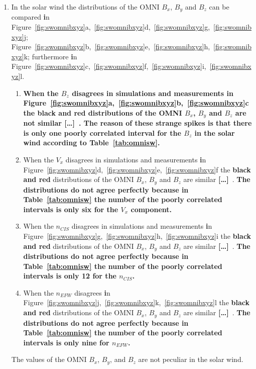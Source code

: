 \documentclass[linenumbers,draft]{agujournal}
\newcommand{\del}{\textbf{[\dots]}\ } %
\begin{document}
\begin{enumerate}
\item In the solar wind the distributions of the OMNI $B_{x}$, $B_{y}$ and $B_{z}$ can be compared \textbf{i}n Figure~\ref{fig:swomnibxyz}a,~\ref{fig:swomnibxyz}d,~\ref{fig:swomnibxyz}g,~\ref{fig:swomnibxyz}j; Figure~\ref{fig:swomnibxyz}b,~\ref{fig:swomnibxyz}e,~\ref{fig:swomnibxyz}h,~\ref{fig:swomnibxyz}k; furthermore \textbf{i}n Figure~\ref{fig:swomnibxyz}c,~\ref{fig:swomnibxyz}f,~\ref{fig:swomnibxyz}i,~\ref{fig:swomnibxyz}l.
\begin{enumerate}
\item \textbf{When the $B_{z}$ disagrees in simulations and measurements \textbf{i}n Figure~\ref{fig:swomnibxyz}a,~\ref{fig:swomnibxyz}b,~\ref{fig:swomnibxyz}c the black and red distributions of the OMNI $B_{x}$, $B_{y}$ and $B_{z}$ are not similar \del. The reason of these strange spikes is that there is only one poorly correlated interval for the $B_{z}$ in the solar wind according to Table~\ref{tab:omnisw}.}

\item When the $V_{x}$ disagrees in simulations and measurements \textbf{i}n Figure~\ref{fig:swomnibxyz}d,~\ref{fig:swomnibxyz}e,~\ref{fig:swomnibxyz}f the \textbf{black and red} distributions of the OMNI $B_{x}$, $B_{y}$ and $B_{z}$ are similar \del. \textbf{The distributions do not agree perfectly because in Table~\ref{tab:omnisw} the number of the poorly correlated intervals is only six for the $V_{x}$ component.}

\item When the $n_{CIS}$ disagrees in simulations and measurements \textbf{i}n Figure~\ref{fig:swomnibxyz}g,~\ref{fig:swomnibxyz}h,~\ref{fig:swomnibxyz}i the \textbf{black and red} distributions of the OMNI $B_{x}$, $B_{y}$ and $B_{z}$ are similar \del. \textbf{The distributions do not agree perfectly because in Table~\ref{tab:omnisw} the number of the poorly correlated intervals is only 12 for the $n_{CIS}$.}
  
\item When the $n_{EFW}$ disagrees \textbf{i}n Figure~\ref{fig:swomnibxyz}j,~\ref{fig:swomnibxyz}k,~\ref{fig:swomnibxyz}l the \textbf{black and red} distributions of the OMNI $B_{x}$, $B_{y}$ and $B_{z}$ are similar \del . \textbf{The distributions do not agree perfectly because in Table~\ref{tab:omnisw} the number of the poorly correlated intervals is only nine for $n_{EFW}$.}
\end{enumerate}
The values of the OMNI $B_{x}$, $B_{y}$, and $B_{z}$ are not peculiar in the solar wind.


\end{enumerate}
\end{document}
